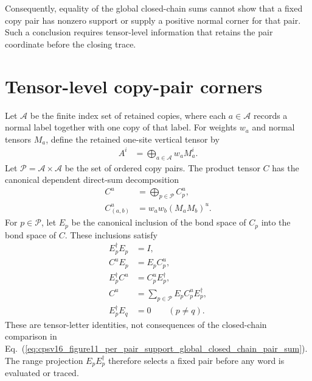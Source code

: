 \documentclass{article}
\begin{document}
Consequently, equality of the global closed-chain sums cannot show that a
fixed copy pair has nonzero support or supply a positive normal corner for
that pair. Such a conclusion requires tensor-level information that retains
the pair coordinate before the closing trace.

\section{Tensor-level copy-pair corners}

Let $\mathcal A$ be the finite index set of retained copies, where each
$a\in\mathcal A$ records a normal label together with one copy of that label.
For weights $w_a$ and normal tensors $M_a$, define the retained one-site
vertical tensor by
\begin{align}
    A^i
        &= \bigoplus_{a\in\mathcal A}w_aM_a^i.
    \label{eq:cpsv16_figure11_per_pair_support_retained_one_site_tensor}
\end{align}
Let $\mathcal P=\mathcal A\times\mathcal A$ be the set of ordered copy pairs.
The product tensor $C$ has the canonical dependent direct-sum decomposition
\begin{align}
    C^u
        &= \bigoplus_{p\in\mathcal P}C_p^u,
    \label{eq:cpsv16_figure11_per_pair_support_pair_direct_sum}\\
    C_{(a,b)}^u
        &= w_aw_b(M_aM_b)^u.
    \label{eq:cpsv16_figure11_per_pair_support_pair_block_definition}
\end{align}
For $p\in\mathcal P$, let $E_p$ be the canonical inclusion of the bond space
of $C_p$ into the bond space of $C$. These inclusions satisfy
\begin{align}
    E_p^\dagger E_p
        &= I,
    \label{eq:cpsv16_figure11_per_pair_support_pair_inclusion_isometry}\\
    C^uE_p
        &= E_pC_p^u,
    \label{eq:cpsv16_figure11_per_pair_support_pair_right_intertwining}\\
    E_p^\dagger C^u
        &= C_p^uE_p^\dagger,
    \label{eq:cpsv16_figure11_per_pair_support_pair_left_intertwining}\\
    C^u
        &= \sum_{p\in\mathcal P}E_pC_p^uE_p^\dagger,
    \label{eq:cpsv16_figure11_per_pair_support_pair_corner_reconstruction}\\
    E_p^\dagger E_q
        &= 0
        \qquad (p\neq q).
    \label{eq:cpsv16_figure11_per_pair_support_distinct_pair_orthogonality}
\end{align}
These are tensor-letter identities, not consequences of the closed-chain
comparison in
Eq.~(\ref{eq:cpsv16_figure11_per_pair_support_global_closed_chain_pair_sum}).
The range projection $E_pE_p^\dagger$ therefore selects a fixed pair before
any word is evaluated or traced.
\end{document}
